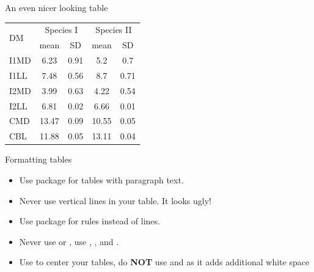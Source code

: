 \documentclass[10pt,times]{beamer}
\begin{document}
\begin{frame}[fragile]{An even nicer looking table}
\begin{exampletwouptinyfifty}
\begin{tabular}{l c c c c}
\toprule
\multirow{2}{*}{DM} 
	& \multicolumn{2}{c}{Species I} 
	& \multicolumn{2}{c}{Species II} \\ 
\cmidrule{2-5}
  & mean & SD  & mean & SD  \\ 
\midrule
I1MD & 6.23 & 0.91 & 5.2  & 0.7  \\

I1LL & 7.48 & 0.56 & 8.7  & 0.71 \\

I2MD & 3.99 & 0.63 & 4.22 & 0.54 \\

I2LL & 6.81 & 0.02 & 6.66 & 0.01 \\

CMD & 13.47 & 0.09 & 10.55 & 0.05 \\

CBL & 11.88 & 0.05 & 13.11 & 0.04\\ 
\bottomrule
\end{tabular}
\end{exampletwouptinyfifty}
\end{frame}


\begin{frame}[fragile]{Formatting tables}
\begin{itemize}
\item Use  package for tables with paragraph text.

\item Never use vertical lines in your table. It looks ugly!

\item Use  package for rules instead of lines.

\item Never use  or , use , 
,  and .

\item Use  to center your tables, do 
\textbf{NOT} use  and  as it adds additional 
white space

\end{itemize}
\end{frame}
\end{document}
